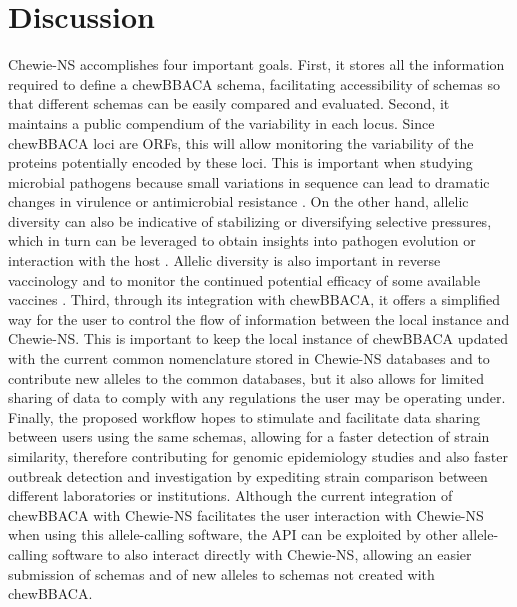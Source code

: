 \section{Discussion} \label{sec:ch3_discussion}

\ac{Chewie-NS} accomplishes four important goals. First, it stores all the information required to define a chewBBACA schema, facilitating accessibility of schemas so that different schemas can be easily compared and evaluated. Second, it maintains a public compendium of the variability in each locus. Since chewBBACA loci are \ac{ORFs}, this will allow monitoring the variability of the proteins potentially encoded by these loci. This is important when studying microbial pathogens because small variations in sequence can lead to dramatic changes in virulence \cite{li_genome-wide_2019} or antimicrobial resistance \cite{van_der_linden_heterogeneity_2020}. On the other hand, allelic diversity can also be indicative of stabilizing or diversifying selective pressures, which in turn can be leveraged to obtain insights into pathogen evolution or interaction with the host \cite{yamaguchi_identification_2019}. Allelic diversity is also important in reverse vaccinology \cite{moxon_editorial_2019} and to monitor the continued potential efficacy of some available vaccines \cite{maiden_impact_2018}. Third, through its integration with chewBBACA, it offers a simplified way for the user to control the flow of information between the local instance and \ac{Chewie-NS}. This is important to keep the local instance of chewBBACA updated with the current common nomenclature stored in \ac{Chewie-NS} databases and to contribute new alleles to the common databases, but it also allows for limited sharing of data to comply with any regulations the user may be operating under. Finally, the proposed workflow hopes to stimulate and facilitate data sharing between users using the same schemas, allowing for a faster detection of strain similarity, therefore contributing for genomic epidemiology studies and also faster outbreak detection and investigation by expediting strain comparison between different laboratories or institutions. Although the current integration of chewBBACA with \ac{Chewie-NS} facilitates the user interaction with \ac{Chewie-NS} when using this allele-calling software, the \ac{API} can be exploited by other allele-calling software to also interact directly with \ac{Chewie-NS}, allowing an easier submission of schemas and of new alleles to schemas not created with chewBBACA. 

